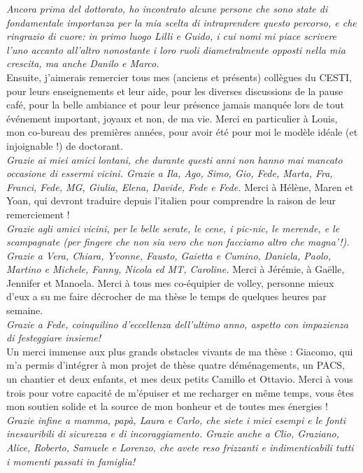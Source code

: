 \emph{Ancora prima del dottorato, ho incontrato alcune persone che sono state di fondamentale importanza per la mia scelta di intraprendere questo percorso, e che ringrazio di cuore: in primo luogo Lilli e Guido, i cui nomi mi piace scrivere l'uno accanto all'altro nonostante i loro ruoli diametralmente opposti nella mia crescita, ma anche Danilo e Marco.}\\

Ensuite, j'aimerais remercier tous mes (anciens et pr\'esents) coll\`{e}gues du CESTI, pour leurs enseignements et leur aide, pour les diverses discussions de la pause caf\'e, pour la belle ambiance et pour leur pr\'esence jamais manqu\'ee lors de tout \'ev\'enement important, joyaux et non, de ma vie.  Merci en particulier \`a Louis, mon co-bureau des premi\`{e}res ann\'ees, pour avoir \'et\'e pour moi le mod\`{e}le id\'eale (et injoignable !) de doctorant.  \\

\emph{Grazie ai miei amici lontani, che durante questi anni non hanno mai mancato occasione di essermi vicini. Grazie a Ila, Ago, Simo, Gio, Fede, Marta, Fra, Franci, Fede, MG, Giulia,  Elena, Davide, Fede e Fede.} Merci \`a H\'el\`{e}ne, Maren et Yoan, qui devront traduire depuis l'italien pour comprendre la raison de leur remerciement ! \\

\emph{Grazie agli amici vicini, per le belle serate, le cene, i pic-nic, le merende, e le scampagnate (per fingere che non sia vero che non facciamo altro che magna'!). Grazie a Vera, Chiara, Yvonne, Fausto, Gaietta e Cumino, Daniela, Paolo, Martino e Michele, Fanny, Nicola ed MT, Caroline.} Merci \`a J\'er\'emie, \`a Ga\"elle, Jennifer et Manoela. Merci \`a tous mes co-\'equipier de volley, personne mieux d'eux a su me faire d\'ecrocher de ma th\`{e}se le temps de quelques heures par semaine. \\

\emph{Grazie a Fede, coinquilino d'eccellenza dell'ultimo anno, aspetto con impazienza di festeggiare insieme!}\\

Un merci immense aux plus grands obstacles vivants de ma th\`{e}se : Giacomo, qui m'a permis d'int\'egrer \`a mon projet de th\`{e}se quatre d\'em\'enagements, un PACS, un chantier et deux enfants, et mes deux petits Camillo et Ottavio. Merci \`a vous trois pour votre capacit\'e de m'\'epuiser et me recharger en m\^eme temps, vous \^etes mon soutien solide  et la source de mon bonheur et de toutes mes \'energies ! \\

\emph{Grazie infine a mamma, pap\`a, Laura e Carlo, che siete i miei esempi e le fonti inesauribili di sicurezza e di  incoraggiamento. Grazie anche a Clio, Graziano, Alice, Roberto, Samuele e Lorenzo, che avete reso frizzanti e indimenticabili tutti i momenti passati in famiglia!}